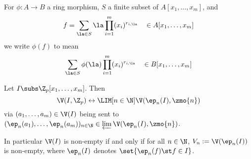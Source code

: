 \begin{nttn}
    For $\phi: A \to B$ a ring morphism,
    $S$ a finite subset of $A[x_1, \dots, x_m]$,
    and
    \[f = \sum_{\la \in S} \la 
    \prod_{i = 1}^m (x_i)^{r_{i,\la}} 
    \quad \in A [x_1, \dots, x_m]\]
    we write $\phi (f)$ to mean 
    \[\sum_{\la \in S} \phi(\la) 
    \prod_{i = 1}^m (x_i)^{r_{i,\la}} 
    \quad \in B [x_1, \dots, x_m]\]
\end{nttn}

\begin{prop}
    Let $I \subs \Z_p [x_1, \dots, x_m]$.
    Then \[\V(I,\Z_p) \leftrightarrow \LIM[n \in \N] \V(\ep_n(I),\zmo{n})\]
    via $(a_1,\dots, a_m) \in \V(I)$
    being sent to
    $(\ep_n(a_1),\dots, \ep_n(a_m))_{n\in\N} \in \varprojlim \V(\ep_n(I),\zmo{n})$.

    In particular $\V(I)$ is non-empty
    if and only if for all $n \in \N$, 
    $V_n := \V (\ep_n(I))$ is non-empty,
    where $\ep_n(I)$ denotes $\set{\ep_n(f) \st f \in I}$.
\end{prop}
